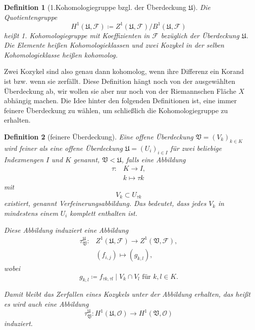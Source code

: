 \documentclass[11pt,a4paper,toc=bibliography]{scrartcl}
\theoremstyle{def}
\newtheorem{defi}{Definition}[section]
\theoremstyle{thm}
\theoremstyle{remark}
\begin{document}

\begin{defi}[1.Kohomologiegruppe bzgl. der Überdeckung $\mathfrak{U}$]
Die Quotientengruppe 
\[
H^1(\mathfrak{U},\mathcal{F})\coloneqq  {Z^1(\mathfrak{U}, \mathcal{F})}/{B^1(\mathfrak{U}, \mathcal{F})} 
\]
heißt \emph{1. Kohomologiegruppe} mit Koeffizienten in $\mathcal{F}$ bezüglich der Überdeckung $\mathfrak{U}$.
Die Elemente heißen \emph{Kohomologieklassen} und zwei Kozykel in der selben Kohomologieklasse heißen \emph{kohomolog}.
\end{defi}
Zwei Kozykel sind also genau dann kohomolog, wenn ihre Differenz ein Korand ist bzw. wenn sie zerfällt.
Diese Definition hängt noch von der ausgewählten Überdeckung ab, wir wollen sie aber nur noch von der Riemannschen Fläche $X$ abhängig machen. Die Idee hinter den folgenden Definitionen ist, eine immer feinere Überdeckung zu wählen, um schließlich die Kohomologiegruppe zu erhalten.
\begin{defi}[feinere Überdeckung]
Eine offene Überdeckung $\mathfrak{V}=(V_k)_{k\in K}$ wird \emph{feiner} als eine offene Überdeckung $\mathfrak{U}=(U_i)_{i\in I}$ für zwei beliebige Indexmengen $I$ und $K$ genannt, $\mathfrak{V}<\mathfrak{U}$, falls eine Abbildung 
\begin{align*}
\tau: & K\rightarrow I,\\
	  & k\mapsto \tau k
\end{align*}
mit
\[
V_{k}\subset U_{\tau k}
\]
existiert, genannt \emph{Verfeinerungsabbildung}. Das bedeutet, dass jedes $V_k$ in mindestens einem $U_i$ komplett enthalten ist.

Diese Abbildung induziert eine Abbildung
\begin{align*}
\tau_{\mathfrak{V}}^{\mathfrak{U}}:& Z^1(\mathfrak{U},\mathcal{F})\rightarrow Z^1(\mathfrak{V},\mathcal{F}),\\
&(f_{i,j})\mapsto (g_{k,l}),
\end{align*}
wobei 
\[
g_{k,l} \coloneqq  f_{\tau k,\tau l}\mid V_k\cap V_l\text{ für } k,l\in K.
\]

Damit bleibt das Zerfallen eines Kozykels unter der Abbildung erhalten, das heißt es wird auch eine Abbildung \[
\tau_{\mathfrak{V}}^{\mathfrak{U}}:H^1(\mathfrak{U},\mathcal{O})\rightarrow H^1(\mathfrak{V},\mathcal{O})
\]
induziert.
\end{defi}
\end{document}
